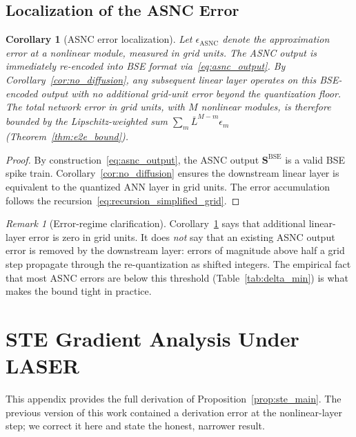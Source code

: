 \documentclass{article}
\theoremstyle{plain}
\newtheorem{corollary}[theorem]{Corollary}
\theoremstyle{definition}
\theoremstyle{remark}
\newtheorem{remark}[theorem]{Remark}
\begin{document}
\subsection{Localization of the ASNC Error}
\label{app:error_localization}

\begin{corollary}[ASNC error localization]
\label{cor:asnc_localization}
Let $\epsilon_{\mathrm{ASNC}}$ denote the approximation error at a nonlinear
module, measured in grid units. The ASNC output is immediately re-encoded
into BSE format via~\eqref{eq:asnc_output}. By
Corollary~\ref{cor:no_diffusion}, any subsequent linear layer operates on
this BSE-encoded output with no additional grid-unit error beyond the
quantization floor. The total network error in grid units, with $M$
nonlinear modules, is therefore bounded by the Lipschitz-weighted sum
$\sum_m \bar{L}^{M-m}\epsilon_m$ (Theorem~\ref{thm:e2e_bound}).
\end{corollary}

\begin{proof}
By construction~\eqref{eq:asnc_output}, the ASNC output
$\mathbf{S}^{\mathrm{BSE}}$ is a valid BSE spike train.
Corollary~\ref{cor:no_diffusion} ensures the downstream linear layer is
equivalent to the quantized ANN layer in grid units. The error accumulation
follows the recursion~\eqref{eq:recursion_simplified_grid}.
\end{proof}

\begin{remark}[Error-regime clarification]
Corollary~\ref{cor:asnc_localization} says that additional linear-layer
error is zero in grid units. It does \emph{not} say that an existing
ASNC output error is removed by the downstream layer: errors of magnitude
above half a grid step propagate through the re-quantization as shifted
integers. The empirical fact that most ASNC errors are below this threshold
(Table~\ref{tab:delta_min}) is what makes the bound tight in practice.
\end{remark}


\section{STE Gradient Analysis Under LASER}
\label{app:ste_proof}

This appendix provides the full derivation of Proposition~\ref{prop:ste_main}.
The previous version of this work contained a derivation error at the
nonlinear-layer step; we correct it here and state the honest, narrower
result.
\end{document}
